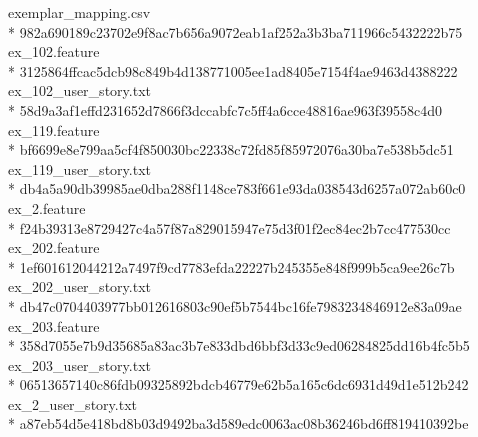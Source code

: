 \medskip
{\footnotesize\ttfamily\raggedright\setlength{\parindent}{0pt}
exemplar\_mapping.csv\\*
\hspace*{2ex}982a690189c23702e9f8ac7b656a9072eab1af252a3b3ba711966c5432222b75\\[3pt]
ex\_102.feature\\*
\hspace*{2ex}3125864ffcac5dcb98c849b4d138771005ee1ad8405e7154f4ae9463d4388222\\[3pt]
ex\_102\_user\_story.txt\\*
\hspace*{2ex}58d9a3af1effd231652d7866f3dccabfc7c5ff4a6cce48816ae963f39558c4d0\\[3pt]
ex\_119.feature\\*
\hspace*{2ex}bf6699e8e799aa5cf4f850030bc22338c72fd85f85972076a30ba7e538b5dc51\\[3pt]
ex\_119\_user\_story.txt\\*
\hspace*{2ex}db4a5a90db39985ae0dba288f1148ce783f661e93da038543d6257a072ab60c0\\[3pt]
ex\_2.feature\\*
\hspace*{2ex}f24b39313e8729427c4a57f87a829015947e75d3f01f2ec84ec2b7cc477530cc\\[3pt]
ex\_202.feature\\*
\hspace*{2ex}1ef601612044212a7497f9cd7783efda22227b245355e848f999b5ca9ee26c7b\\[3pt]
ex\_202\_user\_story.txt\\*
\hspace*{2ex}db47c0704403977bb012616803c90ef5b7544bc16fe7983234846912e83a09ae\\[3pt]
ex\_203.feature\\*
\hspace*{2ex}358d7055e7b9d35685a83ac3b7e833dbd6bbf3d33c9ed06284825dd16b4fc5b5\\[3pt]
ex\_203\_user\_story.txt\\*
\hspace*{2ex}06513657140c86fdb09325892bdcb46779e62b5a165c6dc6931d49d1e512b242\\[3pt]
ex\_2\_user\_story.txt\\*
\hspace*{2ex}a87eb54d5e418bd8b03d9492ba3d589edc0063ac08b36246bd6ff819410392be\\[3pt]
}
